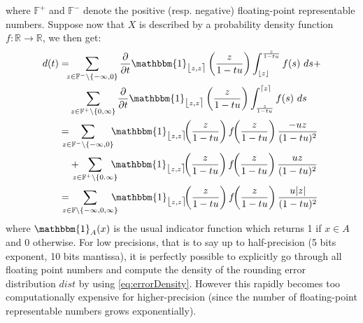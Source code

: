 \documentclass[10pt,conference]{IEEEtran}
\newcommand{\ceil}[1]{\lceil #1 \rceil}
\newcommand{\floor}[1]{\lfloor #1 \rfloor}
\newcommand{\fintvl}[1][x]{\mathlarger{\lfloor}#1,#1\mathlarger{\rceil}}
\newcommand{\F}{\mathbb{F}}
\newcommand{\R}{\mathbb{R}}
\newcommand{\one}{\mathbbm{1}}
\newcommand{\absv}[1]{\vert #1\vert}
\newcommand{\dt}{\frac{\partial}{\partial t}}
\begin{document}
where $\F^+$ and $\F^-$ denote the positive (resp. negative) floating-point representable numbers.
Suppose now that $X$ is described by a probability density function $f:\R\to\R$, we then get:
\begin{align}
d(t)
=&\hspace{-1ex}\sum_{z\in\F^-\setminus\{-\infty,0\}}\dt\one_{\fintvl[z]}\left(\frac{z}{1-tu}\right) \int^{\frac{z}{1-tu}}_{\floor{z}} f(s)~ds+\nonumber 
\\
&\sum_{z\in\F^+\setminus\{0,\infty\}}\dt\one_{\fintvl[z]}\left(\frac{z}{1-tu}\right) \int^{\ceil{z}}_{\frac{z}{1-tu}} f(s)~ds\nonumber 
\\
=&\hspace{-2ex}\sum_{z\in\F^-\setminus\{-\infty,0\}}\hspace{-1ex}\one_{\fintvl[z]}\hspace{-4pt}\left(\frac{z}{1-tu}\right) f\hspace{-3pt}\left(\frac{z}{1-tu}\right) \frac{-uz}{(1-tu)^2}\nonumber
\\
& +\hspace{-2ex}\sum_{z\in\F^+\setminus\{0.\infty\}}\hspace{-2ex}\one_{\fintvl[z]}\hspace{-4pt}\left(\frac{z}{1-tu}\right) f\hspace{-3pt}\left(\frac{z}{1-tu}\right) \frac{uz}{(1-tu)^2}\nonumber 
\\
=&\hspace{-2ex}\sum_{z\in\F\setminus\{-\infty,0,\infty\}}\hspace{-2ex}\one_{\fintvl[z]}\hspace{-4pt}\left(\frac{z}{1-tu}\right) f\hspace{-3pt}\left(\frac{z}{1-tu}\right) \frac{u\absv{z}}{(1-tu)^2}\label{eq:errorDensity}
\end{align}
where $\one_{A}(x)$ is the usual indicator function which returns 1 if $x\in A$ and 0 otherwise. For low precisions, that is to say up to half-precision (5 bits exponent, 10 bits mantissa), it is perfectly possible to explicitly go through all floating point numbers and compute the density of the rounding error distribution $dist$ by using \cref{eq:errorDensity}. However this rapidly becomes too computationally expensive for higher-precision (since the number of floating-point representable numbers grows exponentially).
\end{document}
